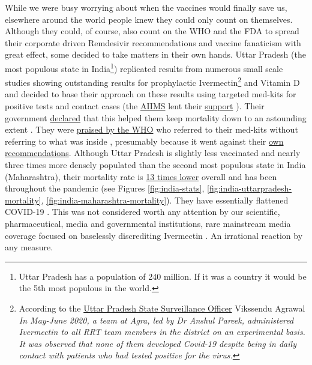 \documentclass[11pt,a4paper,notitlepage]{report}
\begin{document}
While we were busy worrying about when the vaccines would finally save us, elsewhere around the world people knew they could only count on themselves. Although they could, of course, also count on the WHO and the FDA to spread their corporate driven Remdesivir recommendations and vaccine fanaticism with great effect, some decided to take matters in their own hands. Uttar Pradesh (the most populous state in India\footnote{Uttar Pradesh has a population of 240 million. If it was a country it would be the 5th most populous in the world.}) replicated results from numerous small scale studies showing outstanding results for prophylactic Ivermectin\footnote{According to the \href{https://indianexpress.com/article/cities/lucknow/uttar-pradesh-government-says-ivermectin-helped-to-keep-deaths-low-7311786/}{Uttar Pradesh State Surveillance Officer} Vikssendu Agrawal \cite{indianexpress12052021} \textit{In May-June 2020, a team at Agra, led by Dr Anshul Pareek, administered Ivermectin to all RRT team members in the district on an experimental basis. It was observed that none of them developed Covid-19 despite being in daily contact with patients who had tested positive for the virus.}} and Vitamin D and decided to base their approach on these results using targeted med-kits for positive tests and contact cases (the \href{https://www.aiims.edu/en.html}{AIIMS} lent their \href{https://www.cureus.com/articles/64807-prophylactic-role-of-ivermectin-in-severe-acute-respiratory-syndrome-coronavirus-2-infection-among-healthcare-workers}{support} \cite{Behera2021-qu}). Their government \href{https://indianexpress.com/article/cities/lucknow/uttar-pradesh-government-says-ivermectin-helped-to-keep-deaths-low-7311786/}{declared} that this helped them keep mortality down to an astounding extent \cite{indianexpress12052021}. They were \href{https://www.who.int/india/news/feature-stories/detail/uttar-pradesh-going-the-last-mile-to-stop-covid-19}{praised by the WHO} \cite{who07052021} who referred to their med-kits without referring to what was inside \cite{medicalupdateonline21052021} \cite{hindu14092020}, presumably because it went against their \href{https://www.who.int/news-room/feature-stories/detail/who-advises-that-ivermectin-only-be-used-to-treat-covid-19-within-clinical-trials}{own recommendations}. Although Uttar Pradesh is slightly less vaccinated and nearly three times more densely populated than the second most populous state in India (Maharashtra), their mortality rate is \hyperref[fig:india-stats]{13 times lower} overall and has been throughout the pandemic (see Figures \ref{fig:india-stats}, \ref{fig:india-uttarpradesh-mortality}, \ref{fig:india-maharashtra-mortality}). They have essentially flattened COVID-19 \cite{hindustantimes19092021}. This was not considered worth any attention by our scientific, pharmaceutical, media and governmental institutions, rare mainstream media coverage focused on baselessly discrediting Ivermectin \cite{torontoStar28012022}. An irrational reaction by any measure.
\end{document}
